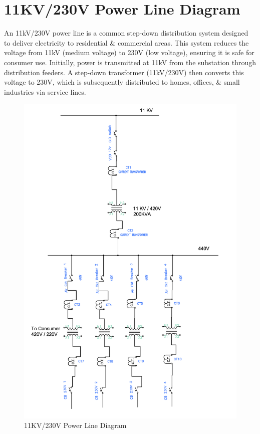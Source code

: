 \documentclass[12pt]{article}
\begin{document}
\section*{11KV/230V Power Line Diagram}
An 11kV/230V power line is a common step-down distribution system designed to deliver electricity to residential \& commercial areas. This system reduces the voltage from 11kV (medium voltage) to 230V (low voltage), ensuring it is safe for consumer use. Initially, power is transmitted at 11kV from the substation through distribution feeders. A step-down transformer (11kV/230V) then converts this voltage to 230V, which is subsequently distributed to homes, offices, \& small industries via service lines.

\begin{figure}[H]
    \centering
    \includegraphics[width=.76\textwidth]{2.png}
    \caption{11KV/230V Power Line Diagram}
    \label{fig:power_line}
\end{figure}
\end{document}
